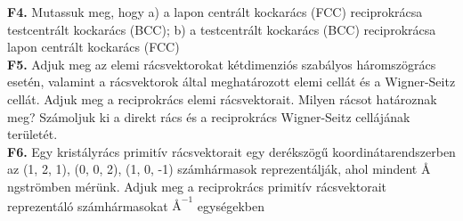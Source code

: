 \documentclass[12pt]{article}
\begin{document}
\textbf{F4.} Mutassuk meg, hogy 
a) a lapon centrált kockarács (FCC) reciprokrácsa testcentrált kockarács (BCC);
b) a testcentrált kockarács (BCC) reciprokrácsa lapon centrált kockarács (FCC)
\\

\textbf{F5.} Adjuk  meg  az  elemi  rácsvektorokat kétdimenziós  szabályos háromszögrács esetén,  valamint  a  rácsvektorok  által  meghatározott  elemi  cellát  és  a Wigner-Seitz  cellát.  Adjuk  meg  a reciprokrács elemi rácsvektorait. Milyen rácsot határoznak meg? Számoljuk ki a direkt rács és a reciprokrács Wigner-Seitz cellájának területét.
\\

\textbf{F6.} Egy kristályrács primitív rácsvektorait egy derékszögű koordinátarendszerben az (1, 2, 1), (0, 0, 2), (1, 0, -1) számhármasok reprezentálják, ahol mindent $\si{\angstrom}$ngströmben mérünk. Adjuk meg a reciprokrács primitív rácsvektorait reprezentáló számhármasokat $\si{\angstrom}^{-1}$ egységekben
\end{document}
